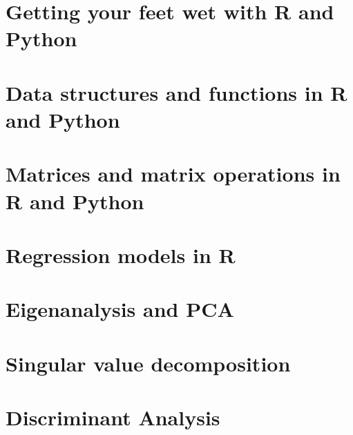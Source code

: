 \documentclass[10pt,oneside,bigheadings,tablecaptionabove]{scrbook}
\begin{document}


\clearscrheadfoot
\pagestyle{scrheadings}

\titleLL
\clearpage
{}


\tableofcontents
\clearpage


\clearscrheadfoot
{}
\ihead{\tikzhead\headmark}
\ohead{\pagemark}
\pagestyle{scrheadings}
\renewcommand*{\chapterpagestyle}{scrheadings}
 

\chapter{Getting your feet wet with R and Python}



\chapter{Data structures and functions in R and Python}


\chapter{Matrices and matrix operations in R and Python}


\chapter{Regression models in R}


\chapter{Eigenanalysis and PCA}


\chapter{Singular value decomposition}


\chapter{Discriminant Analysis}

\end{document}
